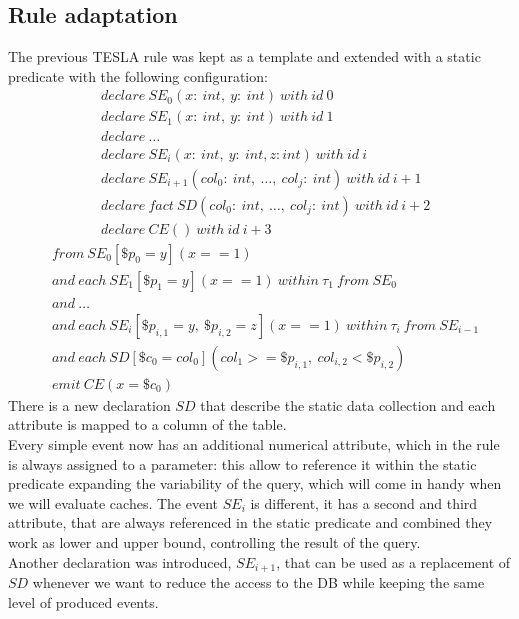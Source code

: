 \subsection{Rule adaptation}
The previous TESLA rule was kept as a template and extended with a static predicate with the following configuration:
\begin{align*}
&declare\ SE_0(x:\ int,\ y:\ int)\ with\ id\ 0\\
&declare\ SE_1(x:\ int,\ y:\ int)\ with\ id\ 1\\
&declare\ \ldots\\
&declare\ SE_i(x:\ int,\ y:\ int, z: int)\ with\ id\ i\\
&declare\ SE_{i+1}(col_0:\ int,\ \ldots,\ col_j:\ int)\ with\ id\ i+1\\
&declare\ fact\ SD(col_0:\ int,\ \ldots,\ col_j:\ int)\ with\ id\ i+2\\
&declare\ CE()\ with\ id\ i+3
\end{align*}
\begin{align*}
&from\ SE_0[\$p_0 = y](x == 1)\\
&and\ each\ SE_1[\$p_1 = y](x == 1)\ within\ \tau_1\ from\ SE_0\\
&and\ \ldots\\
&and\ each\ SE_i[\$p_{i,1} = y,\ \$p_{i,2} = z](x == 1)\ within\ \tau_i\ from\ SE_{i-1}\\
&and\ each\ SD[\$c_0 = col_0](col_1 >= \$p_{i,1},\ col_{i,2} < \$p_{i,2})\\
&emit\ CE(x = \$c_0)
\end{align*}
There is a new declaration $SD$ that describe the static data collection and each attribute is mapped to a column of the table. \\
Every simple event now has an additional numerical attribute, which in the rule is always assigned to a parameter: this allow to reference it within the static predicate expanding the variability of the query, which will come in handy when we will evaluate caches. The event $SE_i$ is different, it has a second and third attribute, that are always referenced in the static predicate and combined they work as lower and upper bound, controlling the result of the query.\\
Another declaration was introduced, $SE_{i+1}$, that can be used as a replacement of $SD$ whenever we want to reduce the access to the DB while keeping the same level of produced events.

